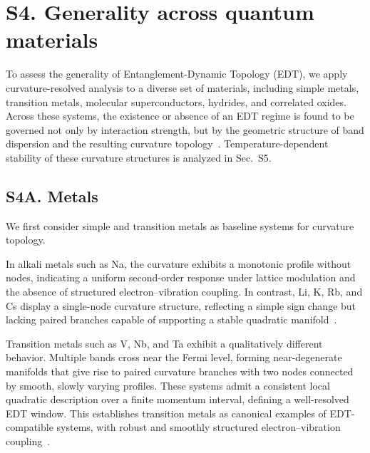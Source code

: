 \documentclass[12pt]{article}
\begin{document}
\section*{S4. Generality across quantum materials}

To assess the generality of Entanglement-Dynamic Topology (EDT), we apply curvature-resolved analysis to a diverse set of materials, including simple metals, transition metals, molecular superconductors, hydrides, and correlated oxides. Across these systems, the existence or absence of an EDT regime is found to be governed not only by interaction strength, but by the geometric structure of band dispersion and the resulting curvature topology~\cite{Kittel2004,Ziman1972,Giustino2017}. Temperature-dependent stability of these curvature structures is analyzed in Sec.~S5.

\subsection*{S4A. Metals}

We first consider simple and transition metals as baseline systems for curvature topology.

In alkali metals such as Na, the curvature exhibits a monotonic profile without nodes, indicating a uniform second-order response under lattice modulation and the absence of structured electron--vibration coupling. In contrast, Li, K, Rb, and Cs display a single-node curvature structure, reflecting a simple sign change but lacking paired branches capable of supporting a stable quadratic manifold~\cite{Kittel2004,Hu2025_APQ,Hu2026_JPCM}.

Transition metals such as V, Nb, and Ta exhibit a qualitatively different behavior. Multiple bands cross near the Fermi level, forming near-degenerate manifolds that give rise to paired curvature branches with two nodes connected by smooth, slowly varying profiles. These systems admit a consistent local quadratic description over a finite momentum interval, defining a well-resolved EDT window. This establishes transition metals as canonical examples of EDT-compatible systems, with robust and smoothly structured electron--vibration coupling~\cite{Giustino2017,Baroni2001,Hu2024_ACP}.
\end{document}
